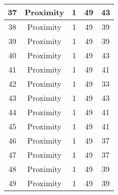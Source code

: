 \documentclass[results.tex]{subfiles}
\begin{document}
\begin{center}
\begin{tabular}{| c || c | c | c | c |}
            \hline
            37                      & Proximity                    & 1                      & 49                      & 43                   \\
            \hline
            38                      & Proximity                    & 1                      & 49                      & 39                   \\
            \hline
            39                      & Proximity                    & 1                      & 49                      & 39                   \\
            \hline
            40                      & Proximity                    & 1                      & 49                      & 43                   \\
            \hline
            41                      & Proximity                    & 1                      & 49                      & 41                   \\
            \hline
            42                      & Proximity                    & 1                      & 49                      & 33                   \\
            \hline
            43                      & Proximity                    & 1                      & 49                      & 43                   \\
            \hline
            44                      & Proximity                    & 1                      & 49                      & 41                   \\
            \hline
            45                      & Proximity                    & 1                      & 49                      & 41                   \\
            \hline
            46                      & Proximity                    & 1                      & 49                      & 37                   \\
            \hline
            47                      & Proximity                    & 1                      & 49                      & 37                   \\
            \hline
            48                      & Proximity                    & 1                      & 49                      & 39                   \\
            \hline
            49                      & Proximity                    & 1                      & 49                      & 39                   \\
            \hline
        \end{tabular}
    \end{center}
\end{document}
